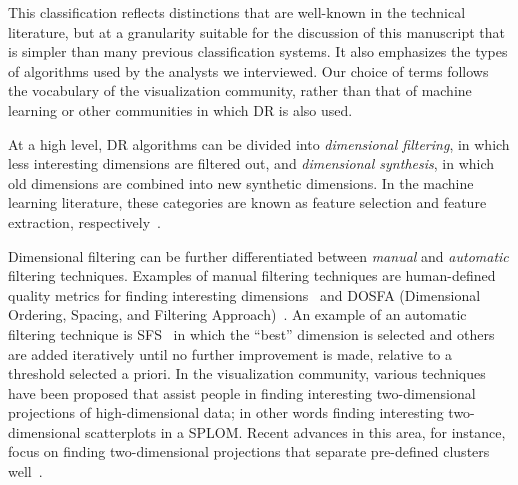 
This classification reflects distinctions that are well-known in the technical literature, but at a granularity suitable for the discussion of this manuscript that is simpler than many previous classification systems. 
It also emphasizes the types of algorithms used by the analysts we interviewed. 
Our choice of terms follows the vocabulary of the visualization community, rather than that of machine learning or other communities in which \ac{DR} is also used.

At a high level, \ac{DR} algorithms can be divided into {\it dimensional filtering}, in which less interesting dimensions are filtered out, and {\it dimensional synthesis}, in which old dimensions are combined into new synthetic dimensions. 
In the machine learning literature, these categories are known as feature selection and feature extraction, respectively~\cite{Witten2011}. 

Dimensional filtering can be further differentiated between {\it manual} and {\it automatic} filtering techniques. 
Examples of manual filtering techniques are human-defined quality metrics for finding interesting dimensions~\cite{Johansson2009} and DOSFA (Dimensional Ordering, Spacing, and Filtering Approach)~\cite{Yang2003}. 
An example of an automatic filtering technique is \ac{SFS}~\cite{Jain2000} in which the ``best'' dimension is selected and others are added iteratively until no further improvement is made, relative to a threshold selected a priori.
In the visualization community, various techniques have been proposed that assist people in finding interesting two-dimensional projections of high-dimensional data; in other words finding interesting two-dimensional scatterplots in a \ac{SPLOM}. 
Recent advances in this area, for instance, focus on finding two-dimensional projections that separate pre-defined clusters well~\cite{Sips2009,Tatu2010a}. 

